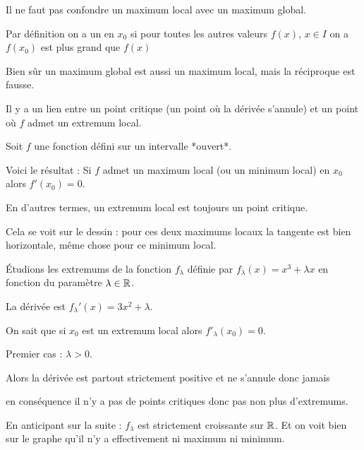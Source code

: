 \change

Il ne faut pas confondre un maximum  local avec un maximum global.

Par définition on a un  en $x_0$ 
si pour toutes les autres valeurs $f(x)$, $x\in I$
on a $f(x_0)$ est plus grand que $f(x)$

\change

Bien sûr un maximum global est aussi un maximum local, mais la réciproque est fausse.

\diapo


Il y a un lien entre un point critique (un point où la dérivée s'annule)
et un point où $f$ admet un extremum local.

Soit $f$ une fonction défini sur un intervalle *ouvert*.



Voici le résultat : 
 Si $f$ admet un maximum local (ou un minimum local)
en $x_0$ alors $f'(x_0)=0$. 

En d'autres termes, un extremum local  est toujours un point critique. 

\change


Cela se voit sur le dessin : pour ces deux maximums locaux la tangente est bien horizontale,
même chose pour ce minimum local.




\diapo

\'Etudions les extremums de la fonction $f_\lambda$ définie par
$f_\lambda(x)= x^3+\lambda x$ en fonction du paramètre $\lambda \in \mathbb{R}$.

\change


La dérivée est $f_\lambda'(x) = 3x^2+\lambda$.

\change

On sait que si $x_0$ est un extremum local
alors $f'_\lambda(x_0)=0$.

\change

Premier cas : $\lambda>0$.

Alors la dérivée est partout strictement positive et ne s'annule donc jamais 

\change

en conséquence il n'y a pas de points critiques
donc pas non plus d'extremums. 

\change

En anticipant sur la suite : $f_\lambda$ est strictement croissante sur $\mathbb{R}$.
Et on voit bien sur le graphe qu'il n'y a effectivement ni maximum ni minimum.

